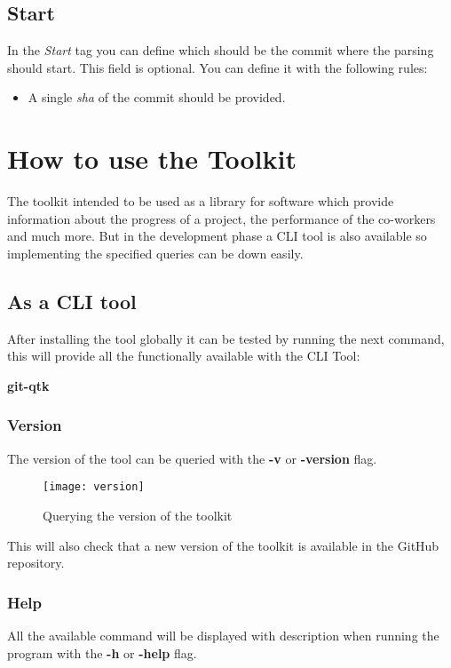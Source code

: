 \subsection{Start}

In the \textit{Start} tag you can define which should be the commit where the parsing should start.
This field is optional.
You can define it with the following rules:

\begin{itemize}
	\item A single \textit{sha} of the commit should be provided.
\end{itemize}

\section{How to use the Toolkit}
The toolkit intended to be used as a library for software which provide information about the progress of a project, the performance of the co-workers and much more. But in the development phase a CLI tool is also available so implementing the specified queries can be down easily.

\subsection{As a CLI tool}
After installing the tool globally it can be tested by running the next command, this will provide all the functionally available with the CLI Tool:

\textbf{git-qtk}
\subsubsection{Version}
The version of the tool can be queried with the \textbf{-v} or \textbf{-version} flag.

\begin{figure}[H]
	\centering
	\texttt{[image: version]}
	\caption{Querying the version of the toolkit}
	\label{fig:fig-version}
\end{figure}

This will also check that a new version of the toolkit is available in the GitHub repository\cite{repo}. 

\newpage
\subsubsection{Help}
All the available command will be displayed with description when running the program with the \textbf{-h} or \textbf{-help} flag.

